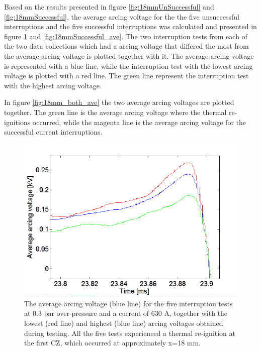 \documentclass[10pt,b5paper,twoside]{article}
\begin{document}
Based on the results presented in figure \ref{fig:18mmUnSuccessful} and \ref{fig:18mmSuccessful}, the average arcing voltage for the the five unsuccessful interruptions and the five successful interruptions was calculated and presented in figure \ref{fig:18mmUnSuccessful_ave} and \ref{fig:18mmSuccessful_ave}. The two interruption tests from each of the two data collections which had a arcing voltage that differed the most from the average arcing voltage is plotted together with it. The average arcing voltage is represented with a blue line, while the interruption test with the lowest arcing voltage is plotted with a red line. The green line represent the interruption test with the highest arcing voltage. 

In figure \ref{fig:18mm_both_ave} the two average arcing voltages are plotted together. The green line is the average arcing voltage where the thermal re-ignitions occurred, while the magenta line is the average arcing voltage for the successful current interruptions.

\begin{figure}[H]
\centering
\includegraphics[scale=0.6, angle =0 ]{Bilder/Results/ArcingVoltage_18_reIgnition_average.PNG}
\caption{The average arcing voltage (blue line) for the five interruption tests at 0.3 bar over-pressure and a current of 630 A, together with the lowest (red line) and highest (blue line) arcing voltages obtained during testing. All the five tests experienced a thermal re-ignition at the first CZ, which occurred at approximately  x=18 mm.} \label{fig:18mmUnSuccessful_ave}
\end{figure}
\end{document}
